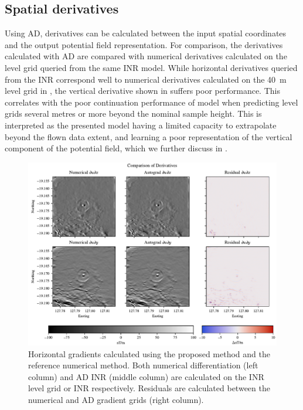 \subsection{Spatial derivatives}
Using AD, derivatives can be calculated between the input spatial coordinates and the output potential field representation.
For comparison, the derivatives calculated with AD are compared with numerical derivatives calculated on the level grid queried from the same INR model.
While horizontal derivatives queried from the INR correspond well to numerical derivatives calculated on the \qty{40}{\m} level grid in , the vertical derivative shown in  suffers poor performance.
This correlates with the poor continuation performance of model when predicting level grids several metres or more beyond the nominal sample height.
This is interpreted as the presented model having a limited capacity to extrapolate beyond the flown data extent, and learning a poor representation of the vertical component of the potential field, which we further discuss in .
\begin{figure}[hbtp]
    \centering{}
    \includegraphics[width=1.0\linewidth]{fig/p3/P864_dh_comparison.pdf}
    \caption[Horizontal derivatives]{Horizontal gradients calculated using the proposed method and the reference numerical method.
        Both numerical differentiation (left column) and AD INR (middle column) are calculated on the INR level grid or INR respectively.
        Residuals are calculated between the numerical and AD gradient grids (right column).}
    \label{fig:horigrad}
\end{figure}

